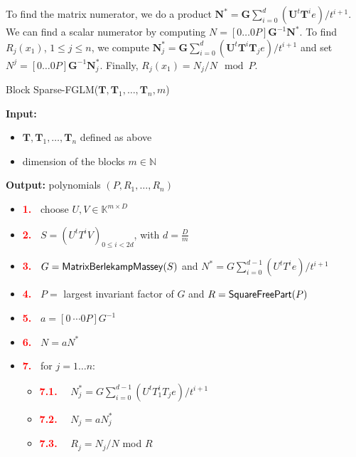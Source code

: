 \documentclass[12pt]{article}
\def\mG{\mathbf{G}}
\def\mN{\mathbf{N}}
\def\mT{\mathbf{T}}
\def\mU{\mathbf{U}}
\begin{document}
To find the matrix numerator, we do a product 
$\mN^* = \mG\sum_{i=0}^{d} (\mU^t \mT^i e)/ t^{i+1}$. We can find a
scalar numerator by computing $N =  [0 \dots 0 P] \mG^{-1} \mN^*$. To find $R_j(x_1)$, $1 \le j \le n$,
we compute 
$\mN^*_j = \mG \sum_{i=0}^{d} (\mU^t \mT^i \mT_j e) / {t^{i+1}}$
and set $N^j =
[0 \dots 0 P] \mG^{-1} \mN^*_j$. Finally, $R_j(x_1) = N_j / N \mod P$.

\begin{algorithm}[H]
	\label{algo:block-sparse-fglm}
	\caption{Block Sparse-FGLM($\mT,\mT_1,\dots,\mT_n,m$)}
	{\bf Input:} \vspace{-0.5em}
	\begin{itemize}
		\item $\mT,\mT_1,\dots,\mT_n$ defined as above
		\item dimension of the blocks $m \in \mathbb{N}$
	\end{itemize}
	{\bf Output:} polynomials $(P,R_1,\dots,R_n)$
	\begin{itemize}
		\item[]\textcolor{red}{\bf 1.~} {\sf choose $U,V \in \mathbb{K}^{m \times D}$}
		\item[]\textcolor{red}{\bf 2.~} {\sf $S= (U^tT^iV)_{0 \le i < 2d}$, with $d = \frac{D}{m}$}
		\item[]\textcolor{red}{\bf 3.~} {\sf $G = {\sf MatrixBerlekampMassey}(S)$ and 
			$N^* = G\sum_{i=0}^{d-1} {(U^tT^ie)}/{t^{i+1}}$}
		\item[]\textcolor{red}{\bf 4.~} {\sf $P=$ largest invariant factor of $G$ and $R={\sf SquareFreePart}(P)$}
		\item[]\textcolor{red}{\bf 5.~} {\sf $a = [0 ~\cdots 0 P] G^{-1}$}
		\item[]\textcolor{red}{\bf 6.~} {\sf $N=aN^*$}
		\item[]\textcolor{red}{\bf 7.~} {\sf for $j = 1 \dots n$:}
		\begin{itemize}
			\item[]\textcolor{red}{\bf 7.1.} ~~{\sf	$N_j^* = G\sum_{i= 0}^{d-1} {(U^tT_1^i T_j e)}/{t^{i+1}}$}
			\item[]\textcolor{red}{\bf 7.2.} ~~{\sf $N_j=aN_j^*$}
			\item[]\textcolor{red}{\bf 7.3.} ~~{\sf $R_j=N_j/N$ mod $R$}
		\end{itemize}
	\end{itemize}
\end{algorithm}
\end{document}
